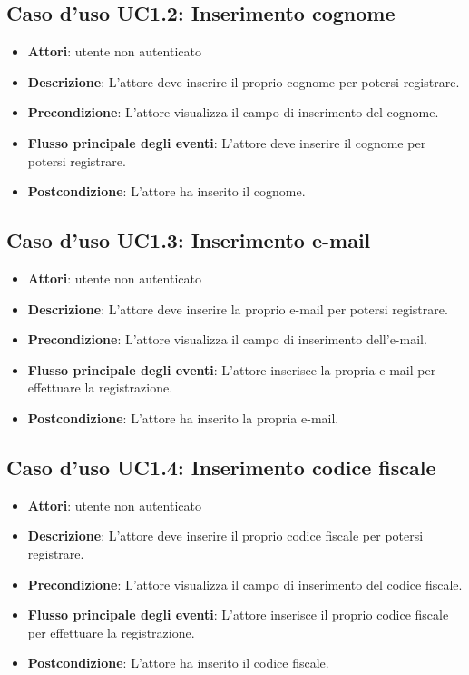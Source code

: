 \subsection{Caso d'uso \texorpdfstring{UC1.2}{UC1.2}: Inserimento cognome}
\begin{itemize}
\item \textbf{Attori}: utente non autenticato
\item \textbf{Descrizione}: L'attore deve inserire il proprio cognome per potersi registrare.
\item \textbf{Precondizione}: L'attore visualizza il campo di inserimento del cognome.
\item \textbf{Flusso principale degli eventi}: L'attore deve inserire il cognome per potersi registrare.
\item \textbf{Postcondizione}: L'attore ha inserito il cognome.
\end{itemize}
\subsection{Caso d'uso \texorpdfstring{UC1.3}{UC1.3}: Inserimento e-mail}
\begin{itemize}
\item \textbf{Attori}: utente non autenticato
\item \textbf{Descrizione}: L'attore deve inserire la proprio e-mail per potersi registrare.
\item \textbf{Precondizione}: L'attore visualizza il campo di inserimento dell'e-mail.
\item \textbf{Flusso principale degli eventi}: L'attore inserisce la propria e-mail per effettuare la registrazione.
\item \textbf{Postcondizione}: L'attore ha inserito la propria e-mail.
\end{itemize}
\subsection{Caso d'uso \texorpdfstring{UC1.4}{UC1.4}: Inserimento codice fiscale}
\begin{itemize}
\item \textbf{Attori}: utente non autenticato
\item \textbf{Descrizione}: L'attore deve inserire il proprio codice fiscale per potersi registrare.
\item \textbf{Precondizione}: L'attore visualizza il campo di inserimento del codice fiscale.
\item \textbf{Flusso principale degli eventi}: L'attore inserisce il proprio codice fiscale per effettuare la registrazione.
\item \textbf{Postcondizione}: L'attore ha inserito il codice fiscale.
\end{itemize}
